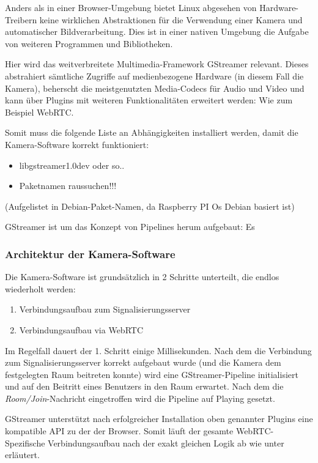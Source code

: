 \documentclass{IEEEtran}
\begin{document}
\begin{twocolumn}
Anders als in einer Browser-Umgebung bietet Linux abgesehen von
Hardware-Treibern keine wirklichen Abstraktionen für die Verwendung einer
Kamera und automatischer Bildverarbeitung. Dies ist in einer nativen Umgebung
die Aufgabe von weiteren Programmen und Bibliotheken.

Hier wird das weitverbreitete Multimedia-Framework GStreamer relevant. Dieses
abstrahiert sämtliche Zugriffe auf medienbezogene Hardware (in diesem Fall die
Kamera), beherscht die meistgenutzten Media-Codecs für Audio und Video und kann
über Plugins mit weiteren Funktionalitäten erweitert werden: Wie zum Beispiel
WebRTC.\

Somit muss die folgende Liste an Abhängigkeiten installiert werden, damit die
Kamera-Software korrekt funktioniert:

\begin{itemize}
	\item libgstreamer1.0dev oder so..
	\item Paketnamen raussuchen!!!
\end{itemize}

(Aufgelistet in Debian-Paket-Namen, da Raspberry PI Os Debian basiert ist)

GStreamer ist um das Konzept von Pipelines herum aufgebaut: Es 

\subsubsection{Architektur der Kamera-Software}

Die Kamera-Software ist grundsätzlich in 2 Schritte unterteilt, die endlos
wiederholt werden:

\begin{enumerate}
	\item Verbindungsaufbau zum Signalisierungsserver
	\item Verbindungsaufbau via WebRTC
\end{enumerate}

Im Regelfall dauert der 1. Schritt einige Millisekunden. Nach dem die
Verbindung zum Signalisierungsserver korrekt aufgebaut wurde (und die Kamera
dem festgelegten Raum beitreten konnte) wird eine GStreamer-Pipeline
initialisiert und auf den Beitritt eines Benutzers in den Raum erwartet. Nach
dem die \textit{Room/Join}-Nachricht eingetroffen wird die Pipeline auf Playing
gesetzt.

GStreamer unterstützt nach erfolgreicher Installation oben genannter Plugins
eine kompatible API zu der der Browser. Somit läuft der gesamte
WebRTC-Spezifische Verbindungsaufbau nach der exakt gleichen Logik ab wie unter
 erläutert.



\end{twocolumn}
\end{document}

